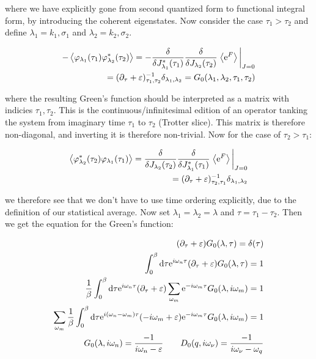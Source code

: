 where we have explicitly gone from second quantized form to functional integral form, by introducing the coherent eigenstates. Now consider the case $\tau_1 > \tau_2$ and define $\lambda_1 = k_1, \sigma_1$ and $\lambda_2 = k_2, \sigma_2$. 

\begin{align*}
    - \expval{\varphi_{\lambda_1}(\tau_1) \varphi^{*}_{\lambda_2}(\tau_2)} = - \fdv{}{J_{\lambda_1}^*(\tau_1)} \fdv{}{J_{\lambda_2}(\tau_2)} \eval{\expval{\e^F}}_{J = 0} \\ = (\partial_\tau + \varepsilon)^{-1}_{\tau_1, \tau_2} \delta_{\lambda_1, \lambda_2} = G_{0}(\lambda_1, \lambda_2, \tau_1, \tau_2) 
\end{align*}

where the resulting Green's function should be interpreted as a matrix with indicies $\tau_1, \tau_2$. This is the continuous/infinitesimal edition of an operator tanking the system from imaginary time $\tau_1$ to $\tau_2$ (Trotter slice). This matrix is therefore non-diagonal, and inverting it is therefore non-trivial. Now for the case of $\tau_2 > \tau_1$: 

\begin{align*}
    \expval{\varphi^{*}_{\lambda_2}(\tau_2)\varphi_{\lambda_1}(\tau_1) } =  \fdv{}{J_{\lambda_2}(\tau_2)} \fdv{}{J_{\lambda_1}^*(\tau_1)}\eval{\expval{\e^F}}_{J = 0} \\ = (\partial_\tau + \varepsilon)^{-1}_{\tau_2, \tau_1} \delta_{\lambda_1, \lambda_2} 
\end{align*}

we therefore see that we don't have to use time ordering explicitly, due to the definition of our statistical average. Now set $\lambda_1 = \lambda_2 = \lambda$ and $\tau = \tau_1 - \tau_2$. Then we get the equation for the Green's function: 

\begin{align*}
    (\partial_\tau + \varepsilon)G_0(\lambda, \tau) = \delta(\tau) \\ 
    \int_{0}^{\beta} \dd \tau \mathrm{e}^{i\omega_n \tau}(\partial_\tau + \varepsilon)G_0(\lambda, \tau) = 1 \\ 
    \frac{1}{\beta}\int_{0}^{\beta} \dd \tau \mathrm{e}^{i\omega_n \tau} (\partial_\tau + \varepsilon) \sum_{\omega_m} \mathrm{e}^{-i\omega_m \tau}G_0(\lambda, i\omega_m) = 1 \\ 
    \sum_{\omega_m} \frac{1}{\beta}\int_{0}^{\beta} \dd \tau \mathrm{e}^{i(\omega_n - \omega_m)\tau} (-i\omega_m + \varepsilon) \mathrm{e}^{-i\omega_m \tau}G_0(\lambda, i\omega_m) = 1 \\ 
    G_0(\lambda, i\omega_n) = \frac{-1}{i\omega_n - \varepsilon} \quad \quad D_0(q, i\omega_\nu) = \frac{-1}{i\omega_\nu - \omega_q}
\end{align*}

